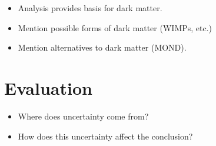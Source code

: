 \documentclass{article}
\begin{document}
\begin{itemize}
    \item Analysis provides basis for dark matter.
    \item Mention possible forms of dark matter (WIMPs, etc.)
    \item Mention alternatives to dark matter (MOND).
\end{itemize}

\section{Evaluation}\label{sec:evaluation}

\begin{itemize}
    \item Where does uncertainty come from?
    \item How does this uncertainty affect the conclusion?
\end{itemize}

% 
% 
% 
% 

\nocite{*}
\printbibliography
\end{document}
